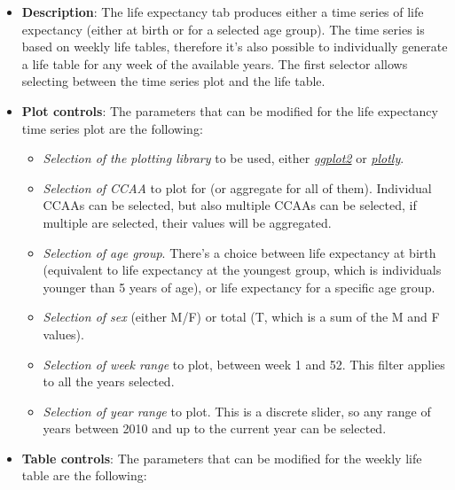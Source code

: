 \documentclass[
  a4paper]{article}
\providecommand{\tightlist}{%
  \setlength{\itemsep}{0pt}\setlength{\parskip}{0pt}}
\begin{document}
\begin{itemize}
\item
  \textbf{Description}: The life expectancy tab produces either a time
  series of life expectancy (either at birth or for a selected age
  group). The time series is based on weekly life tables, therefore it's
  also possible to individually generate a life table for any week of
  the available years. The first selector allows selecting between the
  time series plot and the life table.
\item
  \textbf{Plot controls}: The parameters that can be modified for the
  life expectancy time series plot are the following:

  \begin{itemize}
  \tightlist
  \item
    \emph{Selection of the plotting library} to be used, either
    \href{https://ggplot2.tidyverse.org/}{\emph{ggplot2}} or
    \href{https://plotly.com/r/}{\emph{plotly}}.
  \item
    \emph{Selection of CCAA} to plot for (or aggregate for all of them).
    Individual CCAAs can be selected, but also multiple CCAAs can be
    selected, if multiple are selected, their values will be aggregated.
  \item
    \emph{Selection of age group}. There's a choice between life
    expectancy at birth (equivalent to life expectancy at the youngest
    group, which is individuals younger than 5 years of age), or life
    expectancy for a specific age group.
  \item
    \emph{Selection of sex} (either M/F) or total (T, which is a sum of
    the M and F values).
  \item
    \emph{Selection of week range} to plot, between week 1 and 52. This
    filter applies to all the years selected.
  \item
    \emph{Selection of year range} to plot. This is a discrete slider,
    so any range of years between 2010 and up to the current year can be
    selected.
  \end{itemize}
\item
  \textbf{Table controls}: The parameters that can be modified for the
  weekly life table are the following:


\end{itemize}
\end{document}

